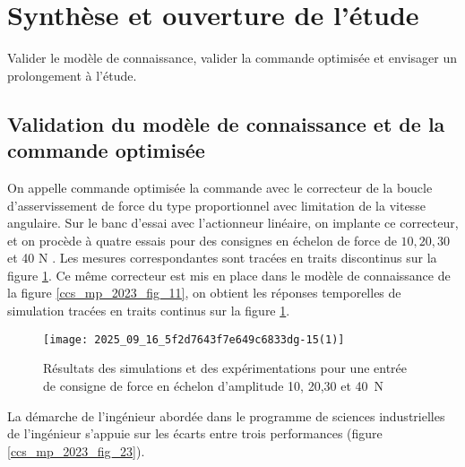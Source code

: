 \section{Synthèse et ouverture de l'étude}
\begin{obj}
Valider le modèle de connaissance, valider la commande optimisée et envisager un prolongement à l'étude.
\end{obj}

\subsection{Validation du modèle de connaissance et de la commande optimisée}%
\ifprof
\else

On appelle commande optimisée la commande avec le correcteur de la boucle d'asservissement de force du type proportionnel avec limitation de la vitesse angulaire. Sur le banc d'essai avec l'actionneur linéaire, on implante ce correcteur, et on procède à quatre essais pour des consignes en échelon de force de $10,20,30$ et 40 N . Les mesures correspondantes sont tracées en traits discontinus sur la figure \ref{ccs_mp_2023_fig_22}. Ce même correcteur est mis en place dans le modèle de connaissance de la figure \ref{ccs_mp_2023_fig_11}, on obtient les réponses temporelles de simulation tracées en traits continus sur la figure \ref{ccs_mp_2023_fig_22}.


\begin{figure}[!h]
\centering
\texttt{[image: 2025\_09\_16\_5f2d7643f7e649c6833dg-15(1)]}
\caption{\label{ccs_mp_2023_fig_22}   Résultats des simulations et des expérimentations pour une entrée de consigne de force en échelon d'amplitude 10, 20,30 et \SI{40}{N}}
\end{figure}



La démarche de l'ingénieur abordée dans le programme de sciences industrielles de l'ingénieur %
s'appuie sur les écarts entre trois performances (figure \ref{ccs_mp_2023_fig_23}).

